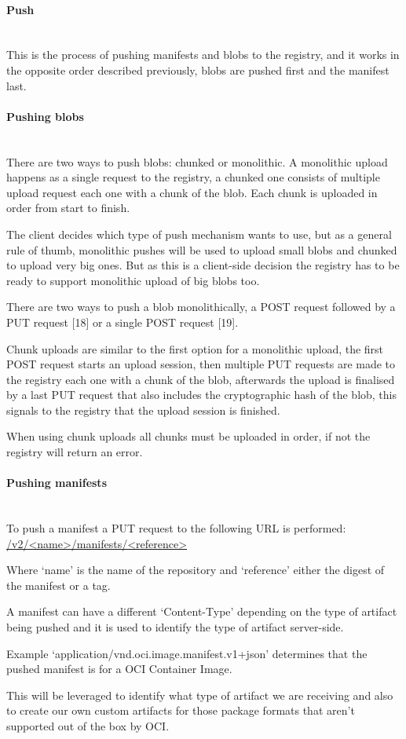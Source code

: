 \documentclass{article}
\newcommand{\subsubsubsection}[1]{\paragraph{#1}\mbox{}\\}
\begin{document}
  \subsubsubsection{Push}

  This is the process of pushing manifests and blobs to the registry, and it works in the opposite order described previously, blobs are pushed first and the manifest last.

  \subsubsubsection{Pushing blobs}

  There are two ways to push blobs: chunked or monolithic. A monolithic upload happens as a single request to the registry, a chunked one consists of multiple upload request each one with a chunk of the blob. Each chunk is uploaded in order from start to finish.
  
  The client decides which type of push mechanism wants to use, but as a general rule of thumb, monolithic pushes will be used to upload small blobs and chunked to upload very big ones.
  But as this is a client-side decision the registry has to be ready to support monolithic upload of big blobs too. 

  There are two ways to push a blob monolithically, a POST request followed by a PUT request [18] or a single POST request [19].
  
  Chunk uploads are similar to the first option for a monolithic upload, the first POST request starts an upload session, then multiple PUT requests are made to the registry each one with a chunk of the blob, afterwards the upload is finalised by a last PUT request that also includes the cryptographic hash of the blob, this signals to the registry that the upload session is finished.

  When using chunk uploads all chunks must be uploaded in order, if not the registry will return an error.
  
  \subsubsubsection{Pushing manifests}

  To push a manifest a PUT request to the following URL is performed: \url{/v2/<name>/manifests/<reference>}

  Where `name' is the name of the repository and `reference' either the digest of the manifest or a tag.

  A manifest can have a different `Content-Type' depending on the type of artifact being pushed and it is used to identify the type of artifact server-side.
  
  Example `application/vnd.oci.image.manifest.v1+json' determines that the pushed manifest is for a OCI Container Image.

  This will be leveraged to identify what type of artifact we are receiving and also to create our own custom artifacts for those package formats that aren't supported out of the box by OCI.
\end{document}
